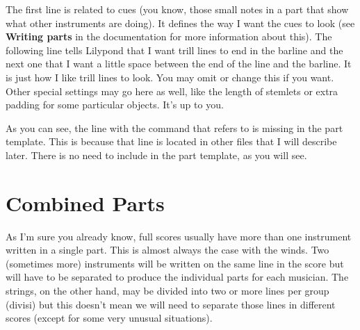 \documentclass[../../LilyPond-Tutorials]{subfiles}
\begin{document}



The first line is related to cues (you know, those small notes in a part that show what other instruments are doing).
It defines the way I want the cues to look (see \textbf{Writing parts} in the documentation for more information about this).
The following line tells Lilypond that I want trill lines to end in the barline and the next one that I want a little space between the end of the line and the barline.
It is just how I like trill lines to look.
You may omit or change this if you want.
Other special settings may go here as well, like the length of stemlets or extra padding for some particular objects.
It's up to you.

As you can see, the line with the  command that refers to  is missing in the part template.
This is because that line is located in other files that I will describe later.
There is no need to include  in the part template, as you will see.


\section{Combined Parts}
\label{sec:combined-parts}

As I'm sure you already know, full scores usually have more than one instrument written in a single part.
This is almost always the case with the winds.
Two (sometimes more) instruments will be written on the same line in the score but will have to be separated to produce the individual parts for each musician.
The strings, on the other hand, may be divided into two or more lines per group (divisi) but this doesn't mean we will need to separate those lines in different scores (except for some very unusual situations).
\end{document}
